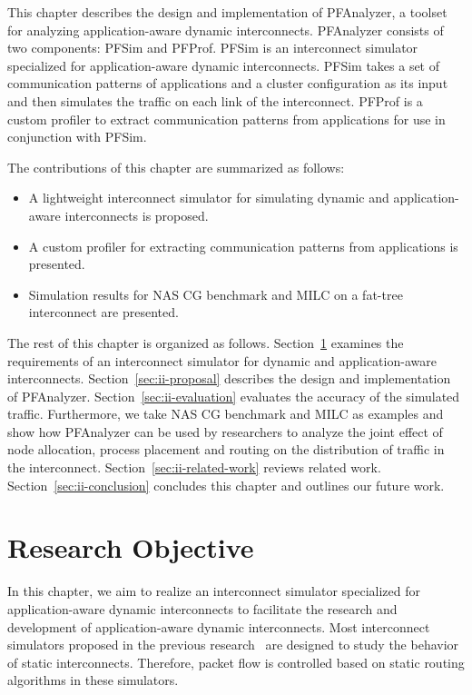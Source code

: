 This chapter describes the design and implementation of PFAnalyzer, a
toolset for analyzing application-aware dynamic interconnects.
PFAnalyzer consists of two components: PFSim and PFProf. PFSim is an
interconnect simulator specialized for application-aware dynamic
interconnects. PFSim takes a set of communication patterns of
applications and a cluster configuration as its input and then simulates
the traffic on each link of the interconnect. PFProf is a custom
profiler to extract communication patterns from applications for use in
conjunction with PFSim.

The contributions of this chapter are summarized as follows:

\begin{itemize}
\item
  A lightweight interconnect simulator for simulating dynamic and
  application-aware interconnects is proposed.
\item
  A custom profiler for extracting communication patterns from
  applications is presented.
\item
  Simulation results for NAS CG benchmark and MILC on a fat-tree
  interconnect are presented.
\end{itemize}

The rest of this chapter is organized as follows.
Section~\ref{sec:ii-objective} examines the requirements of an
interconnect simulator for dynamic and application-aware interconnects.
Section~\ref{sec:ii-proposal} describes the design and implementation of
PFAnalyzer. Section~\ref{sec:ii-evaluation} evaluates the accuracy of the
simulated traffic. Furthermore, we take NAS CG benchmark and MILC as examples
and show how PFAnalyzer can be used by researchers to analyze the joint effect
of node allocation, process placement and routing on the distribution of
traffic in the interconnect. Section~\ref{sec:ii-related-work} reviews related
work. Section~\ref{sec:ii-conclusion} concludes this chapter and outlines our
future work.

\section{Research Objective}\label{sec:ii-objective}

In this chapter, we aim to realize an interconnect simulator specialized
for application-aware dynamic interconnects to facilitate the research
and development of application-aware dynamic interconnects. Most
interconnect simulators proposed in the previous
research~\autocites{Schneider2009}{Tikir2009}{Hoefler2010}{Jo2015} are
designed to study the behavior of static interconnects. Therefore,
packet flow is controlled based on static routing algorithms in these
simulators.

